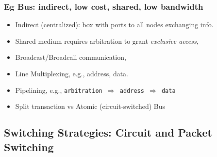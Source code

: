 \documentclass{beamer}
\newcommand{\emp}[1]{\textcolor{DikuRed}{ #1}}
\begin{document}
\begin{frame}[fragile,t]
\frametitle{Eg Bus: indirect, low cost, shared, low bandwidth}

\vspace{-4ex}

\pause
\vspace{-4ex}
\begin{itemize}
    \item \emp{Indirect} ({\scriptsize centralized}): box with ports to all nodes exchanging info.
    \item \emp{Shared} medium requires arbitration to grant {\em exclusive access},
    \item \emp{Broadcast/Broadcall} communication,
    \item \emp{Line Multiplexing}, e.g., address, data.
    \item \emp{Pipelining}, e.g., {\tt arbitration $\Rightarrow$ address $\Rightarrow$ data}
    \item \emp{Split transaction} vs \emp{Atomic} (circuit-switched) Bus\bigskip
\end  {itemize}

\end{frame}

\subsection{Switching Strategies: Circuit and Packet Switching}
\begin{frame}[fragile]
	\tableofcontents[currentsubsection]
\end{frame}
\end{document}
